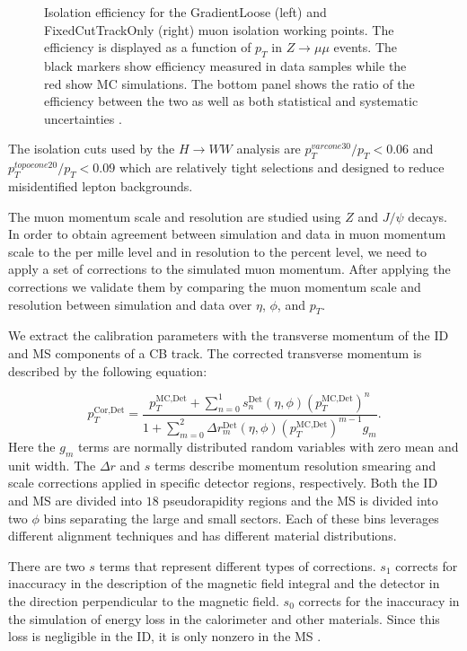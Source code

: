 \begin{figure}[!h]
\begin{minipage}[b]{0.48\textwidth}
  \end{minipage}
  \caption{Isolation efficiency for the GradientLoose (left) and FixedCutTrackOnly (right) muon isolation working points. The efficiency is displayed as a function of $p_T$ in $Z \rightarrow \mu\mu$ events. The black markers show efficiency measured in data samples while the red show MC simulations. The bottom panel shows the ratio of the efficiency between the two as well as both statistical and systematic uncertainties \cite{MCPPlots2}.}
  \label{fig:isolation}
\end{figure}

The isolation cuts used by the $H\rightarrow WW$ analysis are $p_T^{varcone30}/p_T<0.06$ and $p_T^{topocone20}/p_T<0.09$ which are relatively tight selections and designed to reduce misidentified lepton backgrounds. 

The muon momentum scale and resolution are studied using $Z$ and $J/\psi$ decays. In order to obtain agreement between simulation and data in muon momentum scale to the per mille level and in resolution to the percent level, we need to apply a set of corrections to the simulated muon momentum. After applying the corrections we validate them by comparing the muon momentum scale and resolution between simulation and data over $\eta$, $\phi$, and $p_T$.

We extract the calibration parameters with the transverse momentum of the ID and MS components of a CB track.  The corrected transverse momentum is described by the following equation: 

\begin{equation}
    p_T^{\textrm{Cor,Det}} = \frac{p_T^{\textrm{MC,Det}}+\sum\limits_{n=0}^1s_n^{\textrm{Det}}(\eta,\phi)(p_T^{\textrm{MC,Det}})^n}{1+\sum\limits_{m=0}^2\Delta r_m^{\textrm{Det}}(\eta,\phi)(p_T^{\textrm{MC,Det}})^{m-1}g_m} .
\end{equation}
Here the $g_m$ terms are normally distributed random variables with zero mean and unit width. The $\Delta r $ and $s$ terms describe momentum resolution smearing and scale corrections applied in specific detector regions, respectively. Both the ID and MS are divided into $18$ pseudorapidity regions and the MS is divided into two $\phi$ bins separating the large and small sectors. Each of these bins leverages different alignment techniques and has different material distributions. 

There are two $s$ terms that represent different types of corrections. $s_1$ corrects for inaccuracy in the description of the magnetic field integral and the detector in the direction perpendicular to the magnetic field. $s_0$ corrects for the inaccuracy in the simulation of energy loss in the calorimeter and other materials. Since this loss is negligible in the ID, it is only nonzero in the MS \cite{MCPpaper}.

